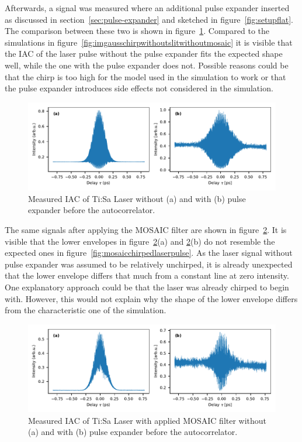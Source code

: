 Afterwards, a signal was measured where an additional pulse expander inserted as discussed in section~\ref{sec:pulse-expander} and sketched in figure~\ref{fig:setupflat}.
The comparison between these two is shown in figure~\ref{fig:measuredchirpedlaserpulsebeforemosaic}.
Compared to the simulations in figure~\ref{fig:imgausschirpwithoutslitwithoutmosaic} it is visible that the \ac{IAC} of the laser pulse without the pulse expander fits the expected shape well, while the one with the pulse expander does not.
Possible reasons could be that the chirp is too high for the model used in the simulation to work or that the pulse expander introduces side effects not considered in the simulation.

\begin{figure}[H]
	\centering
	\includegraphics[width=\linewidth]{figures/chirp/plots/measured_chirped_laser_pulse_before_MOSAIC}
	\caption{Measured IAC of Ti:Sa Laser without (a) and with (b) pulse expander before the autocorrelator.}
	\label{fig:measuredchirpedlaserpulsebeforemosaic}
\end{figure}

The same signals after applying the \ac{MOSAIC} filter are shown in figure~\ref{fig:measuredchirpedlaserpulseaftermosaic}.
It is visible that the lower envelopes in figure~\ref{fig:measuredchirpedlaserpulseaftermosaic}(a) and \ref{fig:measuredchirpedlaserpulseaftermosaic}(b) do not resemble the expected ones in figure~\ref{fig:mosaicchirpedlaserpulse}.
As the laser signal without pulse expander was assumed to be relatively unchirped, it is already unexpected that the lower envelope differs that much from a constant line at zero intensity.
One explanatory approach could be that the laser was already chirped to begin with. However, this would not explain why the shape of the lower envelope differs from the characteristic one of the simulation.

\begin{figure}[H]
	\centering
	\includegraphics[width=\linewidth]{figures/chirp/plots/measured_chirped_laser_pulse_after_MOSAIC}
	\caption{Measured IAC of Ti:Sa Laser with applied MOSAIC filter without (a) and with (b) pulse expander before the autocorrelator.}
	\label{fig:measuredchirpedlaserpulseaftermosaic}
\end{figure}


